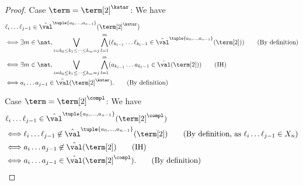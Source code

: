 \begin{proof}
    Case $\term = \term[2]^{\kstar}$:
    We have
    \begin{align*}
         & \ell_{i} \dots \ell_{j-1} \in \hat{\val}^{\tuple{a_0, \dots, a_{n-1}}}(\term[2]^{\kstar})                                                                                       \\                                                                                     & \Longleftrightarrow \exists m \in \nat, \bigvee_{i = k_0 \le k_1 \le \dots \le k_m = j} \bigwedge_{l = 1}^{m} (\ell_{k_{l-1}} \dots \ell_{k_{l}-1} \in \hat{\val}^{\tuple{a_0, \dots, a_{n-1}}}(\term[2]))  \tag{By definition} \\
         & \Longleftrightarrow \exists m \in \nat, \bigvee_{i = k_0 \le k_1 \le \dots \le k_m = j} \bigwedge_{l = 1}^{m} (a_{k_{l-1}} \dots a_{k_{l}-1} \in \hat{\val}(\term[2])) \tag{IH} \\
         & \Longleftrightarrow a_{i} \dots a_{j-1} \in \hat{\val}(\term[2]^{\kstar}).  \tag{By definition}
    \end{align*}

    Case $\term = \term[2]^{\compl}$:
    We have
    \begin{align*}
         & \ell_{i} \dots \ell_{j-1} \in \hat{\val}^{\tuple{a_0, \dots, a_{n-1}}}(\term[2]^{\compl})       \\                                                                                     & \Longleftrightarrow \ell_{i} \dots \ell_{j-1} \not\in \hat{\val}^{\tuple{a_0, \dots, a_{n-1}}}(\term[2])        \tag{By definition, as $\ell_{i} \dots \ell_{j-1} \in X_n$} \\
         & \Longleftrightarrow a_{i} \dots a_{j-1} \not\in \hat{\val}(\term[2]) \tag{IH}                   \\
         & \Longleftrightarrow a_{i} \dots a_{j-1} \in \hat{\val}(\term[2]^{\compl}).  \tag{By definition}
    \end{align*}
\end{proof}

